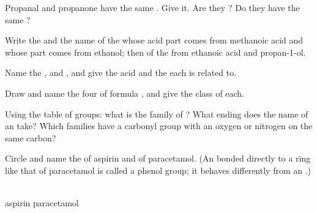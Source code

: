 \begin{exercise}[$\star\star$]\label{exo:g11:functional-groups:7}
Propanal and propanone have the same . Give it. Are
they ? Do they have the same ?
\end{exercise}

\begin{exercise}[$\star\star$]\label{exo:g11:functional-groups:8}
Write the  and the name of the  whose acid
part comes from methanoic acid  and whose  part comes
from ethanol; then of the  from ethanoic acid and propan-1-ol.
\end{exercise}

\begin{exercise}[$\star\star$]\label{exo:g11:functional-groups:9}
Name the  ,  and
, and give the acid and the  each is related to.
\end{exercise}

\begin{exercise}[$\star\star$]\label{exo:g11:functional-groups:10}
Draw and name the four  of formula , and give the
class of each.
\end{exercise}

\begin{exercise}[$\star\star$]\label{exo:g11:functional-groups:11}
Using the table of groups: what is the family of ? What
ending does the name of an  take? Which families have a
carbonyl group with an oxygen or nitrogen  on the same carbon?
\end{exercise}

\begin{exercise}[$\star\star\star$]\label{exo:g11:functional-groups:12}
Circle and name the  of aspirin and of paracetamol.
(An  bonded directly to a ring like that of paracetamol is called
a phenol group; it behaves differently from an .)
\begin{center}
\qquad
{}
\\[2pt] \small aspirin \hspace{4.2cm} paracetamol
\end{center}
\end{exercise}

